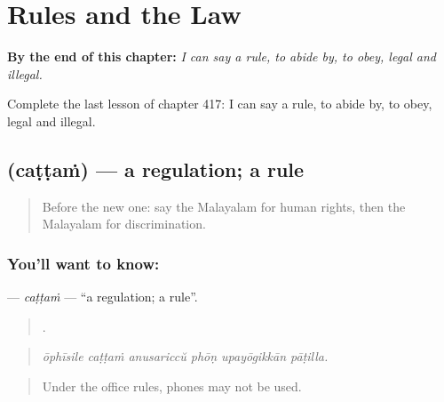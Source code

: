 
\chapter{Rules and the Law}
\label{ch:ml-rules-and-the-law}

\begin{chapteropening}
\textbf{By the end of this chapter:} \emph{I can say a rule, to abide by, to obey, legal and illegal.}

Complete the last lesson of chapter 417: I can say a rule, to abide by, to obey, legal and illegal.
\end{chapteropening}

\section[\texorpdfstring{\ml{ചട്ടം} (caṭṭaṁ)}{ചട്ടം (caṭṭaṁ)}]{ (caṭṭaṁ) — a regulation; a rule}

\label{lesson:ML-C417-cattam}



\begin{quote}
Before the new one: say the Malayalam for human rights, then the Malayalam for discrimination.
\end{quote}

\subsection*{You'll want to know: }
\textbf{} — \emph{caṭṭaṁ} — \textquotedblleft{}a regulation; a rule\textquotedblright{}.

\begin{quote}
     .
\end{quote}

\begin{quote}
\emph{ōphīsile caṭṭaṁ anusariccŭ phōṇ upayōgikkān pāṭilla.}
\end{quote}

\begin{quote}
Under the office rules, phones may not be used.
\end{quote}

